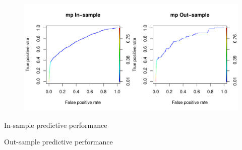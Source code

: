 \documentclass[12pt]{article}
\begin{document}
\begin{figure}
\includegraphics[width=\textwidth]{fig/roc_mp}
\end{figure}

\begin{table}
\centering

\caption{In-sample predictive performance}
\end{table}

\begin{table}
\centering

\caption{Out-sample predictive performance}
\end{table}
\end{document}
